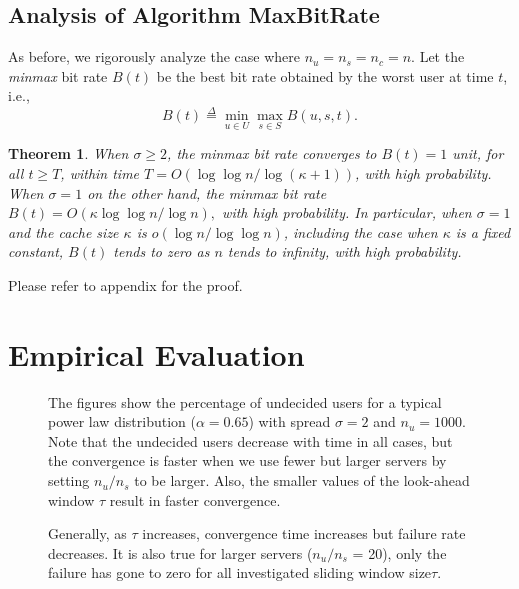 \documentclass[conference]{IEEEtran}
\newtheorem{theorem}{Theorem}
\begin{document}
\subsection{Analysis of Algorithm MaxBitRate}
As before, we rigorously analyze the case where $n_u = n_s = n_c = n$. Let the {\em minmax} bit rate $B(t)$ be the best bit rate obtained by the worst user at time $t$, i.e., 
$$B(t) \stackrel{\Delta}{=} \min_{u \in U} \max_{s \in S} B(u, s, t).$$
\begin{theorem}
\label{thm:bitrate}
When $\sigma \geq 2$, the minmax bit rate converges to $B(t) = 1$ unit, for all $t \geq T$,  within time $T = O(\log\log n/\log (\kappa+1))$, with high probability. When $\sigma = 1$ on the other hand, the minmax bit rate $B(t) =O(\kappa \log\log n/\log n),$ with high probability. In particular, when $\sigma = 1$ and the cache size $\kappa$ is $o(\log n / \log\log n)$, including the case when $\kappa$ is a fixed constant,  $B(t)$ tends to zero as $n$ tends to infinity, with high probability. 
\end{theorem}
Please refer to appendix for the proof.

\section{Empirical Evaluation}
\label{sec:empirical}

\begin{figure*}[t]
  \centering
\begin{minipage}[b]{\textwidth}
  \caption{The figures show the percentage of undecided users for a typical power law distribution ($\alpha=0.65$) with spread $\sigma = 2$ and $n_u = 1000$. Note that the undecided users decrease with time in all cases, but the convergence is faster when we use fewer but larger servers by setting $n_u/n_s$ to be larger.   Also, the smaller values of the look-ahead window $\tau$ result in faster convergence.}
\label{fig:assign}
\end{minipage}
\vspace{0.2in}
\begin{minipage}[b]{\textwidth}
  \centering
  \hspace{1.1in}
\caption{Generally, as $\tau$ increases, convergence time increases but  failure rate decreases. It is also true for larger servers ($n_u/n_s$ = 20), only the failure has gone to zero for all investigated sliding window size$\tau$.}
\label{fig:tau}
\end{minipage}

\end{figure*}
\end{document}
